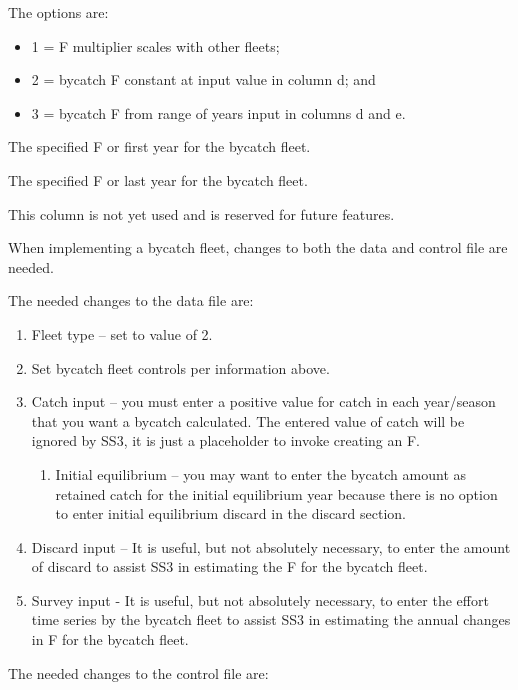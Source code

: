 The options are:  
  \begin{itemize}
  	\item 1 = F multiplier scales with other fleets;
  	\item 2 = bycatch F constant at input value in column d; and
  	\item 3 = bycatch F from range of years input in columns d and e.
  \end{itemize}

The specified F or first year for the bycatch fleet.

The specified F or last year for the bycatch fleet.

This column is not yet used and is reserved for future features.

When implementing a bycatch fleet, changes to both the data and control file are needed.  

The needed changes to the data file are:

\begin{enumerate}
	\item Fleet type – set to value of 2.
	\item Set bycatch fleet controls per information above.
	\item Catch input – you must enter a positive value for catch in each year/season that you want a bycatch calculated.  The entered value of catch will be ignored by SS3, it is just a placeholder to invoke creating an F.
	\begin{enumerate}
		\item Initial equilibrium – you may want to enter the bycatch amount as retained catch for the initial equilibrium year because there is no option to enter initial equilibrium discard in the discard section.
	\end{enumerate}	
	\item Discard input – It is useful, but not absolutely necessary, to enter the amount of discard to assist SS3 in estimating the F for the bycatch fleet.
	\item Survey input - It is useful, but not absolutely necessary, to enter the effort time series by the bycatch fleet to assist SS3 in estimating the annual changes in F for the bycatch fleet.
\end{enumerate}

The needed changes to the control file are:

